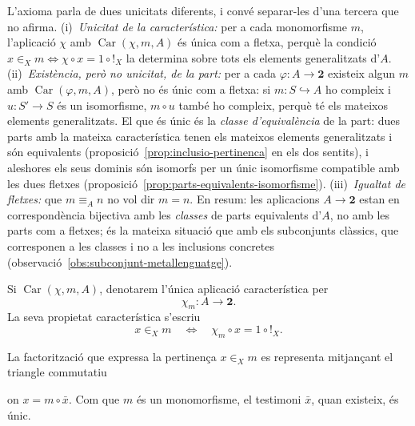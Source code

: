 \begin{observacio}\label{obs:tres-unicitats}
L'axioma parla de dues unicitats diferents, i convé separar-les d'una tercera que no afirma. (i)~\emph{Unicitat de la característica:} per a cada monomorfisme \(m\), l'aplicació \(\chi\) amb \(\operatorname{Car}(\chi,m,A)\) és única com a fletxa, perquè la condició \(x\in_Xm\iff\chi\circ x=1\circ{!}_X\) la determina sobre tots els elements generalitzats d'\(A\). (ii)~\emph{Existència, però no unicitat, de la part:} per a cada \(\varphi\colon A\to\mathbf2\) existeix algun \(m\) amb \(\operatorname{Car}(\varphi,m,A)\), però no és únic com a fletxa: si \(m\colon S\hookrightarrow A\) ho compleix i \(u\colon S'\to S\) és un isomorfisme, \(m\circ u\) també ho compleix, perquè té els mateixos elements generalitzats. El que és únic és la \emph{classe d'equivalència} de la part: dues parts amb la mateixa característica tenen els mateixos elements generalitzats i són equivalents (proposició~\ref{prop:inclusio-pertinenca} en els dos sentits), i aleshores els seus dominis són isomorfs per un únic isomorfisme compatible amb les dues fletxes (proposició~\ref{prop:parts-equivalents-isomorfisme}). (iii)~\emph{Igualtat de fletxes:} que \(m\equiv_An\) no vol dir \(m=n\). En resum: les aplicacions \(A\to\mathbf2\) estan en correspondència bijectiva amb les \emph{classes} de parts equivalents d'\(A\), no amb les parts com a fletxes; és la mateixa situació que amb els subconjunts clàssics, que corresponen a les classes i no a les inclusions concretes (observació~\ref{obs:subconjunt-metallenguatge}).
\end{observacio}

\begin{notacio}\label{not:caracteristica}
Si \(\operatorname{Car}(\chi,m,A)\), denotarem l'única aplicació característica per
\[
\chi_m:A\to\mathbf2.
\]
La seva propietat característica s'escriu
\[
x\in_Xm
\quad\Longleftrightarrow\quad
\chi_m\circ x=1\circ {!}_X.
\]
\end{notacio}

La factorització que expressa la pertinença \(x\in_Xm\) es representa mitjançant el triangle commutatiu
\begin{center}
\end{center}
on \(x=m\circ\bar{x}\). Com que \(m\) és un monomorfisme, el testimoni \(\bar{x}\), quan existeix, és únic.

